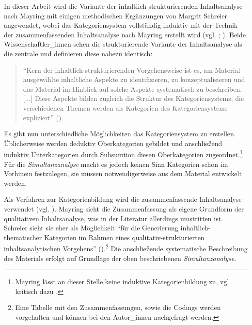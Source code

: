 \documentclass[12pt, titlepage=true, toc=bib]{scrartcl}
\begin{document}
In dieser Arbeit wird die Variante der inhaltlich-strukturierenden Inhaltsanalyse nach Mayring mit einigen methodischen Ergänzungen von Margrit Schreier angewendet, wobei das Kategoriensystem vollständig induktiv mit der Technik der zusammenfassenden Inhaltsanalyse nach Mayring erstellt wird (vgl. \cite{mayring_qualitative_2010}; \cite{schreier_varianten_2014}). Beide Wissenschaftler\_innen sehen die strukturierende Variante der Inhaltsanalyse als die zentrale und definieren diese nahezu identisch:

\begin{singlespace*}
\begin{quote}
"`Kern der inhaltlich-strukturierenden Vorgehensweise ist es, am Material ausgewählte inhaltliche Aspekte zu identifizieren, zu konzeptualisieren und das Material im Hinblick auf solche Aspekte systematisch zu beschreiben. [...] Diese Aspekte bilden zugleich die Struktur des Kategoriensystems; die verschiedenen Themen werden als Kategorien des Kategoriensystems expliziert"' (\cite[5]{schreier_varianten_2014}).
\end{quote}
\end{singlespace*}

\noindent Es gibt nun unterschiedliche Möglichkeiten das Kategoriensystem zu erstellen. Üblicherweise werden deduktiv Oberkategorien gebildet und anschließend induktiv Unterkategorien durch Subsumtion diesen Oberkategorien zugeordnet.\footnote{Mayring lässt an dieser Stelle keine induktive Kategorienbildung zu, vgl. kritisch dazu \textcite[Kap. II.4]{steigleder_strukturierende_2008}.} Für die \textit{Simultanzanalyse} macht es jedoch keinen Sinn Kategorien schon im Vorhinein festzulegen, sie müssen notwendigerweise aus dem Material entwickelt werden. 

Als Verfahren zur Kategorienbildung wird die zusammenfassende Inhaltsanalyse verwendet (vgl. \cite[Kap. 5.5.2]{mayring_qualitative_2010}). Mayring sieht die Zusammenfassung als eigene Grundform der qualitativen Inhaltsanalyse, was in der Literatur allerdings umstritten ist. Schreier sieht sie eher als Möglichkeit "`für die Generierung inhaltlich-thematischer Kategorien im Rahmen eines qualitativ-strukturierten inhaltsanalytischen Vorgehens"' (\cite[14]{schreier_varianten_2014}).\footnote{Eine Tabelle mit den Zusammenfassungen, sowie die Codings werden vorgehalten und können bei den Autor\_innen nachgefragt werden.} Die anschließende systematische Beschreibung des Materials erfolgt auf Grundlage der oben beschriebenen \textit{Simultanzanalyse}.
\end{document}
